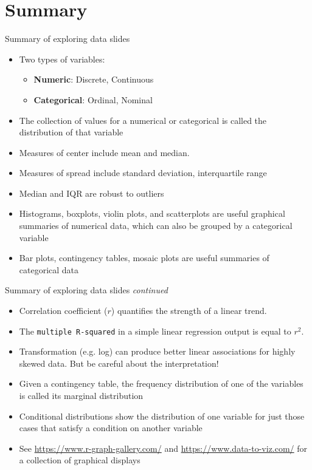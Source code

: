 \documentclass[10pt]{beamer}\usepackage[]{graphicx}\usepackage[]{color}
\begin{document}
\section{Summary}

\begin{frame}{Summary of exploring data slides} 
	
\begin{itemize}
	\item Two types of variables:
	\begin{itemize}
		\item \textbf{Numeric}: Discrete, Continuous
		\item \textbf{Categorical}: Ordinal, Nominal
	\end{itemize}
\pause
\item The collection of values for a numerical or categorical is called the distribution of that variable
\pause
\item Measures of center include mean and median. 
\item Measures of spread include standard deviation, interquartile range
\item Median and IQR are robust to outliers
\pause
\item Histograms, boxplots, violin plots, and scatterplots are useful graphical summaries of numerical data, which can also be grouped by a categorical variable
\item Bar plots, contingency tables, mosaic plots are useful summaries of categorical data
\end{itemize}
\end{frame}

\begin{frame}{Summary of exploring data slides \textit{continued}} 
	
	\begin{itemize}
		\item Correlation coefficient ($r$) quantifies the strength of a linear trend. 
		\item The \texttt{multiple R-squared} in a simple linear regression output is equal to $r^2$. 
		\item Transformation (e.g. log) can produce better linear associations for highly skewed data. But be careful about the interpretation!
		\pause
		\item Given a contingency table, the frequency distribution of one of the variables is called its marginal distribution
		\item Conditional distributions show the distribution of one variable for just those cases that satisfy a condition on another variable
		\item See \url{https://www.r-graph-gallery.com/} and \url{https://www.data-to-viz.com/} for a collection of graphical displays
	\end{itemize}
\end{frame}
\end{document}

